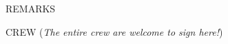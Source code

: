 \documentclass[a6paper]{article}
\begin{document}
  \noindent REMARKS \\[-1ex]
  \framebox[\textwidth][l]{\parbox[t]{\textwidth}{\vspace{15mm}}}
  \smallskip

  \noindent CREW ({\itshape The entire crew are welcome to sign here!}) \\[-1ex]
  \framebox[\textwidth][l]{\parbox[t]{\textwidth}{\vspace{10mm}}}
\end{document}
